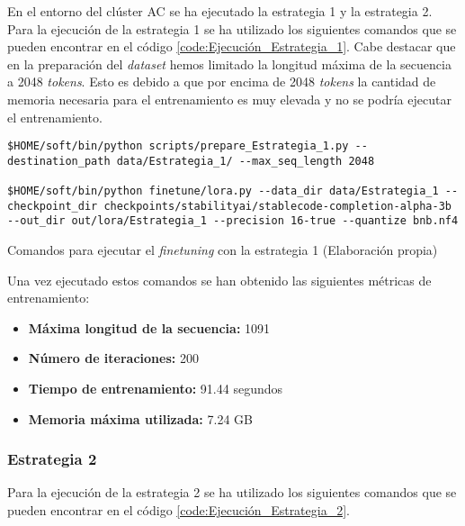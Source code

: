 En el entorno del clúster AC se ha ejecutado la estrategia 1 y la estrategia 2. Para la
ejecución de la estrategia 1 se ha utilizado los siguientes comandos que se pueden encontrar
en el código \ref{code:Ejecución_Estrategia_1}. Cabe destacar que en la preparación del
\textit{dataset} hemos limitado la longitud máxima de la secuencia a 2048 \textit{tokens}.
Esto es debido a que por encima de 2048 \textit{tokens} la cantidad de memoria necesaria
para el entrenamiento es muy elevada y no se podría ejecutar el entrenamiento.

\begin{mycode}
    \begin{verbatim}
$HOME/soft/bin/python scripts/prepare_Estrategia_1.py --destination_path data/Estrategia_1/ --max_seq_length 2048

$HOME/soft/bin/python finetune/lora.py --data_dir data/Estrategia_1 --checkpoint_dir checkpoints/stabilityai/stablecode-completion-alpha-3b --out_dir out/lora/Estrategia_1 --precision 16-true --quantize bnb.nf4
    \end{verbatim}
    \caption[Comandos para ejecutar el \textit{finetuning} con la estrategia 1]{Comandos para ejecutar el \textit{finetuning} con la estrategia 1 (Elaboración propia)}
    \label{code:Ejecución_Estrategia_1}
\end{mycode}

Una vez ejecutado estos comandos se han obtenido las siguientes métricas de entrenamiento:

\begin{itemize}
    \item \textbf{Máxima longitud de la secuencia:} 1091
    \item \textbf{Número de iteraciones:} 200
    \item \textbf{Tiempo de entrenamiento:} 91.44 segundos
    \item \textbf{Memoria máxima utilizada:} 7.24 GB
\end{itemize}

\subsubsection{Estrategia 2}
\label{subsubsec:cluster_ac_ejecucion:estrategia_2}


Para la ejecución de la estrategia 2 se ha utilizado los siguientes comandos que se
pueden encontrar en el código \ref{code:Ejecución_Estrategia_2}.

